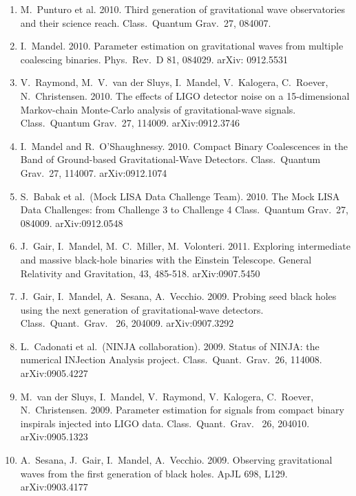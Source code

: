 \documentclass[margin,line]{res}
\begin{document}
\begin{resume}
\begin{enumerate}
\item  M.~Punturo et al. 2010. Third generation of gravitational wave observatories and their science reach.  Class.~Quantum Grav.~27, 084007.

\item  I.~Mandel. 2010.  Parameter estimation on gravitational waves from multiple coalescing binaries.  Phys.~Rev.~D 81, 084029. arXiv: 0912.5531

\item  V.~Raymond, M.~V.~van der Sluys, I.~Mandel, V.~Kalogera, C.~Roever, N.~Christensen. 2010. The effects of LIGO detector noise on a 15-dimensional Markov-chain Monte-Carlo analysis of gravitational-wave signals.  Class.~Quantum Grav.~27, 114009. arXiv:0912.3746

\item  I.~Mandel and R.~O'Shaughnessy.  2010.  Compact Binary Coalescences in the Band of Ground-based Gravitational-Wave Detectors.  Class.~Quantum Grav.~27, 114007. arXiv:0912.1074  

\item  S.~Babak et al.~(Mock LISA Data Challenge Team). 2010.  The Mock LISA Data Challenges: from Challenge 3 to Challenge 4 Class.~Quantum Grav.~27, 084009.  arXiv:0912.0548  

\item  J.~Gair, I.~Mandel, M.~C.~Miller, M.~Volonteri.  2011.  Exploring intermediate and massive black-hole binaries with the Einstein Telescope. General Relativity and Gravitation, 43, 485-518.  arXiv:0907.5450

\item  J.~Gair, I.~Mandel, A.~Sesana, A.~Vecchio.  2009. Probing seed black holes using the next generation of gravitational-wave detectors.  Class.~Quant.~Grav.~ 26, 204009.  arXiv:0907.3292

\item  L.~Cadonati et al.~(NINJA collaboration). 2009. Status of NINJA: the numerical INJection Analysis project.  Class.~Quant.~Grav.~26, 114008. arXiv:0905.4227

\item  M.~van der Sluys, I.~Mandel, V.~Raymond, V.~Kalogera, C.~Roever, N.~Christensen. 2009. Parameter estimation for signals from compact binary inspirals injected into LIGO data.  Class.~Quant.~Grav.~ 26, 204010. arXiv:0905.1323

\item  A.~Sesana, J.~Gair, I.~Mandel, A.~Vecchio. 2009. Observing gravitational waves from the first generation of black holes.  ApJL 698, L129. arXiv:0903.4177 


\end{enumerate}
\end{resume}
\end{document}
